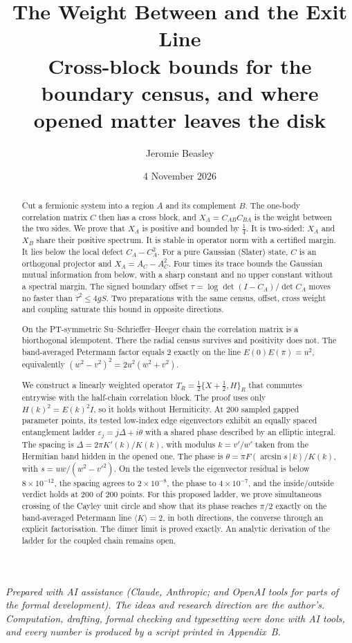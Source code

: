 \documentclass[11pt]{article}
\title{The Weight Between and the Exit Line\\[4pt]\large Cross-block bounds for the boundary census, and where opened matter leaves the disk}
\author{Jeromie Beasley}
\date{4 November 2026}
\theoremstyle{definition}
\begin{document}
\maketitle

\noindent\emph{Prepared with AI assistance (Claude, Anthropic; and OpenAI tools for parts of the formal development). The ideas and research direction are the author's. Computation, drafting, formal checking and typesetting were done with AI tools, and every number is produced by a script printed in Appendix~B.}

\begin{abstract}
Cut a fermionic system into a region $A$ and its complement $B$. The one-body correlation matrix $C$ then has a cross block, and $X_A=C_{AB}C_{BA}$ is the weight between the two sides. We prove that $X_A$ is positive and bounded by $\tfrac14$. It is two-sided: $X_A$ and $X_B$ share their positive spectrum. It is stable in operator norm with a certified margin. It lies below the local defect $C_A-C_A^2$. For a pure Gaussian (Slater) state, $C$ is an orthogonal projector and $X_A=A_C-A_C^2$. Four times its trace bounds the Gaussian mutual information from below, with a sharp constant and no upper constant without a spectral margin. The signed boundary offset $\tau=\log\det(I-C_A)/\det C_A$ moves no faster than $\dot\tau^2\le4gS$. Two preparations with the same census, offset, cross weight and coupling saturate this bound in opposite directions.

On the PT-symmetric Su--Schrieffer--Heeger chain the correlation matrix is a biorthogonal idempotent. There the radial census survives and positivity does not. The band-averaged Petermann factor equals $2$ exactly on the line $E(0)E(\pi)=u^2$, equivalently $(w^2-v^2)^2=2u^2(w^2+v^2)$.

We construct a linearly weighted operator $T_R=\tfrac12\{X+\tfrac12,H\}_R$ that commutes entrywise with the half-chain correlation block. The proof uses only $H(k)^2=E(k)^2I$, so it holds without Hermiticity. At 200 sampled gapped parameter points, its tested low-index edge eigenvectors exhibit an equally spaced entanglement ladder $\varepsilon_j=j\Delta+i\theta$ with a shared phase described by an elliptic integral. The spacing is $\Delta=2\pi K'(k)/K(k)$, with modulus $k=v'/w'$ taken from the Hermitian band hidden in the opened one. The phase is $\theta=\pi F(\arcsin s\,|\,k)/K(k)$, with $s=uw/(w^2-v'^2)$. On the tested levels the eigenvector residual is below $8\times10^{-12}$, the spacing agrees to $2\times10^{-8}$, the phase to $4\times10^{-7}$, and the inside/outside verdict holds at 200 of 200 points. For this proposed ladder, we prove simultaneous crossing of the Cayley unit circle and show that its phase reaches $\pi/2$ exactly on the band-averaged Petermann line $\langle K\rangle=2$, in both directions, the converse through an explicit factorisation. The dimer limit is proved exactly. An analytic derivation of the ladder for the coupled chain remains open.
\end{abstract}
\end{document}

